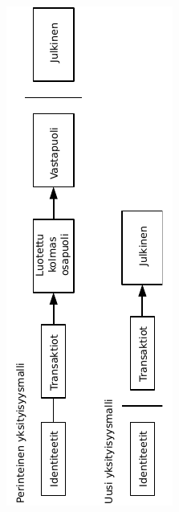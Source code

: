 \documentclass{article}
\begin{document}
\begin{figure}[H]
    \centering
    \includegraphics[angle=270,width=\textwidth]{figures/fig7.pdf}
\end{figure}
\end{document}
